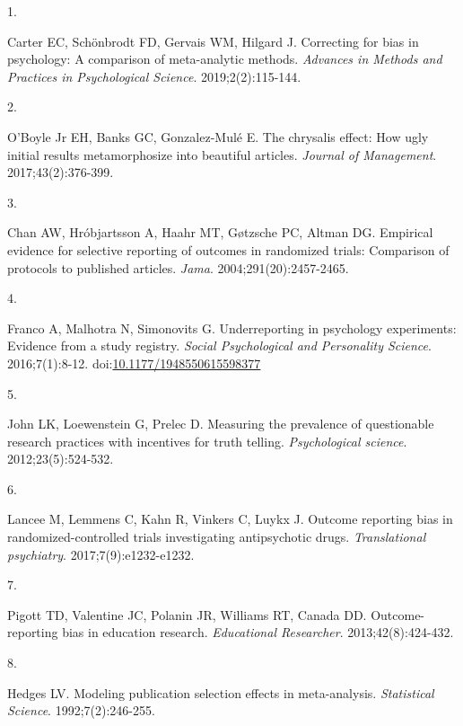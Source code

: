 \documentclass[
  american,
  man, donotrepeattitle,floatsintext]{apa7}
\newlength{\cslhangindent}
\newlength{\csllabelwidth}
\newenvironment{CSLReferences}[2] %
 {\begin{list}{}{%
  \setlength{\itemindent}{0pt}
  \setlength{\leftmargin}{0pt}
  \setlength{\parsep}{0pt}
  \ifodd #1
   \setlength{\leftmargin}{\cslhangindent}
   \setlength{\itemindent}{-1\cslhangindent}
  \fi
  \setlength{\itemsep}{#2\baselineskip}}}
 {\end{list}}
\newcommand{\CSLLeftMargin}[1]{\parbox[t]{\csllabelwidth}{\strut#1\strut}}
\newcommand{\CSLRightInline}[1]{\parbox[t]{\linewidth - \csllabelwidth}{\strut#1\strut}}
\begin{document}
\begin{CSLReferences}{0}{1}
\CSLLeftMargin{1. }%
\CSLRightInline{Carter EC, Schönbrodt FD, Gervais WM, Hilgard J. Correcting for bias in psychology: A comparison of meta-analytic methods. \emph{Advances in Methods and Practices in Psychological Science}. 2019;2(2):115-144.}

\CSLLeftMargin{2. }%
\CSLRightInline{O'Boyle Jr EH, Banks GC, Gonzalez-Mulé E. The chrysalis effect: How ugly initial results metamorphosize into beautiful articles. \emph{Journal of Management}. 2017;43(2):376-399.}

\CSLLeftMargin{3. }%
\CSLRightInline{Chan AW, Hróbjartsson A, Haahr MT, Gøtzsche PC, Altman DG. Empirical evidence for selective reporting of outcomes in randomized trials: Comparison of protocols to published articles. \emph{Jama}. 2004;291(20):2457-2465.}

\CSLLeftMargin{4. }%
\CSLRightInline{Franco A, Malhotra N, Simonovits G. Underreporting in psychology experiments: Evidence from a study registry. \emph{Social Psychological and Personality Science}. 2016;7(1):8-12. doi:\href{https://doi.org/10.1177/1948550615598377}{10.1177/1948550615598377}}

\CSLLeftMargin{5. }%
\CSLRightInline{John LK, Loewenstein G, Prelec D. Measuring the prevalence of questionable research practices with incentives for truth telling. \emph{Psychological science}. 2012;23(5):524-532.}

\CSLLeftMargin{6. }%
\CSLRightInline{Lancee M, Lemmens C, Kahn R, Vinkers C, Luykx J. Outcome reporting bias in randomized-controlled trials investigating antipsychotic drugs. \emph{Translational psychiatry}. 2017;7(9):e1232-e1232.}

\CSLLeftMargin{7. }%
\CSLRightInline{Pigott TD, Valentine JC, Polanin JR, Williams RT, Canada DD. Outcome-reporting bias in education research. \emph{Educational Researcher}. 2013;42(8):424-432.}

\CSLLeftMargin{8. }%
\CSLRightInline{Hedges LV. Modeling publication selection effects in meta-analysis. \emph{Statistical Science}. 1992;7(2):246-255.}


\end{CSLReferences}
\end{document}
